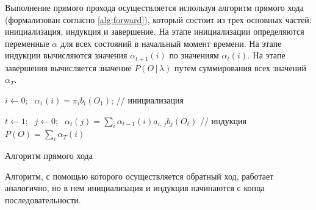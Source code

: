 %
%	
%	
%		
%		
%		
%		
%		
%		
%		
%		

Выполнение прямого прохода осуществляется используя алгоритм прямого хода (формализован согласно \ref{alg:forward}), который состоит из трех основных частей: инициализация, индукция и завершение. На этапе инициализации определяются переменные $\alpha$ для всех состояний в начальный момент времени. На этапе индукции вычисляются значения $\alpha_{t + 1}(i)$ по значениям $\alpha_t(i)$. На этапе завершения вычисляется значение $P(O\,|\,\lambda)$ путем суммирования всех значений $\alpha_T$.

\begin{algorithm}[H]
	$i \leftarrow 0;\;$
	{
		$\alpha_1(i) = \pi_ib_i(O_1)$; // инициализация
	}

	$t \leftarrow 1;\;$
	{
		$j \leftarrow 0;\;$
		{
			$\alpha_t(j) = \displaystyle\sum_i\alpha_{t - 1}(i)a_{i,\,j}b_j(O_t)$ // индукция
		}
	}
	$P(O) = \displaystyle\sum_i\alpha_T(i)$
	\caption{Алгоритм прямого хода}
	\label{alg:forward}
\end{algorithm}
\noindent Алгоритм, с помощью которого осуществляется обратный ход, работает аналогично, но в нем инициализация и индукция начинаются с конца последовательности.
